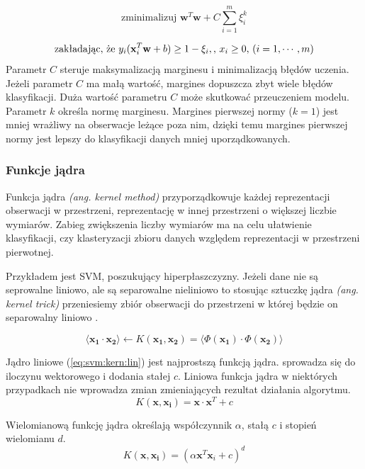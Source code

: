 \documentclass[a4paper,12pt,twoside,openany]{report}
\newcommand{\ang}[1]{\textit{(ang. #1)}}
\newcommand{\Eq}[1]{(\ref{#1})}
\renewcommand{\vec}[1]{\bm{#1}}
\begin{document}
\begin{equation}
\mbox{zminimalizuj } {\vec w}^T {\vec w}+C\sum_{i=1}^m \xi_i^k
\end{equation}

\begin{equation}
	\mbox{zakładając, że }  y_i ({\bf x}_i^T {\bf w}+b) \ge 1-\xi_i,
	\mbox{, }x_i \ge 0 \mbox{, }(i=1,\cdots,m)
\end{equation}
Parametr $C$ steruje maksymalizacją marginesu i minimalizacją błędów uczenia.
Jeżeli parametr $C$ ma małą wartość, margines dopuszcza zbyt wiele błędów klasyfikacji.
Duża wartość parametru $C$ może skutkować przeuczeniem modelu.
Parametr $k$ określa normę marginesu. 
Margines pierwszej normy ($k = 1$) jest mniej wrażliwy na obserwacje leżące poza nim,
dzięki temu margines pierwszej normy jest lepszy do klasyfikacji danych mniej uporządkowanych.

\subsubsection{Funkcje jądra}
Funkcja jądra \ang{kernel method} 
przyporządkowuje każdej reprezentacji obserwacji w przestrzeni,
reprezentację w innej przestrzeni o większej liczbie wymiarów.
Zabieg zwiększenia liczby wymiarów ma na celu ułatwienie 
klasyfikacji, czy klasteryzacji zbioru danych względem
reprezentacji w przestrzeni pierwotnej. 

Przykładem jest SVM, poszukujący hiperpłaszczyzny.
Jeżeli dane nie są seprowalne liniowo,
ale są separowalne nieliniowo to stosując sztuczkę jądra \ang{kernel trick} 
przeniesiemy zbiór obserwacji do przestrzeni w której będzie on separowalny liniowo \cite{Patle2013}.

\begin{equation}
	\langle \vec{x_1} \cdot \vec{x_2} \rangle \gets K(\vec{x_1}, \vec{x_2}) = \langle \Phi(\vec{x_1}) \cdot \Phi(\vec{x_2}) \rangle
\end{equation}

Jądro liniowe \Eq{eq:svm:kern:lin} jest najprostszą funkcją jądra. 
sprowadza się do iloczynu wektorowego i dodania stałej $c$.
Liniowa funkcja jądra w niektórych przypadkach nie wprowadza zmian zmieniających rezultat działania algorytmu.
\begin{equation}
	\label{eq:svm:kern:lin}
	K(\vec x, \vec{x_i}) = \vec x \cdot \vec x ^ T + c
\end{equation}

Wielomianową funkcję jądra określają współczynnik $\alpha$, stałą $c$ i stopień wielomianu $d$.
\begin{equation}
	\label{eq:svm:kern:poly}
	K(\vec x, \vec{x_i}) = (\alpha \vec x^T \vec x_i + c)^d 
\end{equation}
\end{document}
